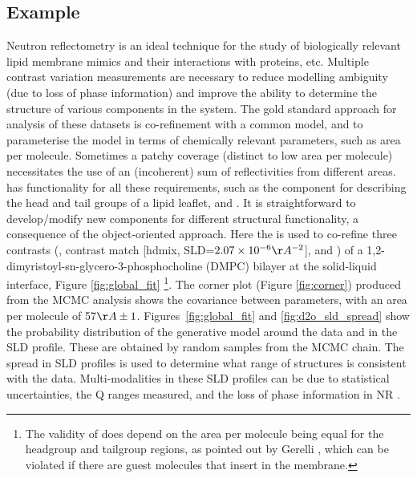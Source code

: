 \documentclass[12pt]{article}
\begin{document}
\subsection*{Example}
Neutron reflectometry is an ideal technique for the study of biologically relevant lipid membrane mimics and their interactions with proteins, etc. Multiple contrast variation measurements are necessary to reduce modelling ambiguity (due to loss of phase information) and improve the ability to determine the structure of various components in the system. The gold standard approach for analysis of these datasets is co-refinement with a common model, and to parameterise the model in terms of chemically relevant parameters, such as area per molecule. Sometimes a patchy coverage (distinct to low area per molecule) necessitates the use of an (incoherent) sum of reflectivities from different areas.  has functionality for all these requirements, such as the \LipidLeaflet component for describing the head and tail groups of a lipid leaflet, and \MixedReflectModel. It is straightforward to develop/modify new components for different structural functionality, a consequence of the object-oriented approach. Here the \LipidLeaflet is used to co-refine three contrasts (,  contrast match [hdmix, SLD=$2.07\times10^{-6}\AA^{-2}$], and ) of a 1,2-dimyristoyl-sn-glycero-3-phosphocholine (DMPC) bilayer at the solid-liquid interface, Figure \ref{fig:global_fit} \footnote{The validity of \LipidLeaflet does depend on the area per molecule being equal for the headgroup and tailgroup regions, as pointed out by Gerelli \cite{Gerelli2016}, which can be violated if there are guest molecules that insert in the membrane.}. The corner plot (Figure \ref{fig:corner}) produced from the MCMC analysis shows the covariance between parameters, with an area per molecule of 57$\AA\pm1$. Figures~\ref{fig:global_fit} and \ref{fig:d2o_sld_spread} show the probability distribution of the generative model around the data and in the SLD profile. These are obtained by random samples from the MCMC chain. The spread in SLD profiles is used to determine what range of structures is consistent with the data. Multi-modalities in these SLD profiles can be due to statistical uncertainties, the Q ranges measured, and the loss of phase information in NR \cite{Majkrzak1999, Heinrich2009}.
\end{document}
